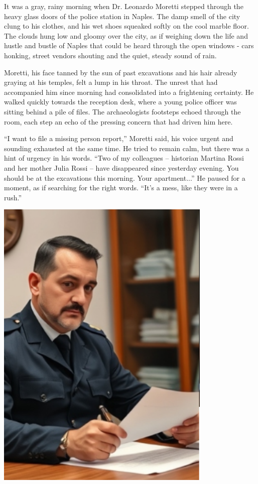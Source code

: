 \documentclass[
]{article}
\begin{document}
It was a gray, rainy morning when Dr. Leonardo Moretti stepped through
the heavy glass doors of the police station in Naples. The damp smell of
the city clung to his clothes, and his wet shoes squeaked softly on the
cool marble floor. The clouds hung low and gloomy over the city, as if
weighing down the life and hustle and bustle of Naples that could be
heard through the open windows - cars honking, street vendors shouting
and the quiet, steady sound of rain.

Moretti, his face tanned by the sun of past excavations and his hair
already graying at his temples, felt a lump in his throat. The unrest
that had accompanied him since morning had consolidated into a
frightening certainty. He walked quickly towards the reception desk,
where a young police officer was sitting behind a pile of files. The
archaeologist\textquotesingle s footsteps echoed through the room, each
step an echo of the pressing concern that had driven him here.

``I want to file a missing person report,'' Moretti said, his voice
urgent and sounding exhausted at the same time. He tried to remain calm,
but there was a hint of urgency in his words. ``Two of my colleagues --
historian Martina Rossi and her mother Julia Rossi -- have disappeared
since yesterday evening. You should be at the excavations this morning.
Your apartment...'' He paused for a moment, as if searching for the
right words. ``It's a mess, like they were in a rush.''

\includegraphics[width=4.0625in,height=5.61458in]{media/image004.png}
\end{document}
